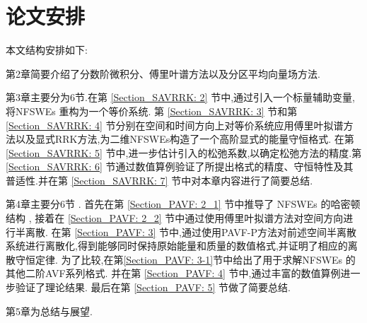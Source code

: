\section{论文安排}
本文结构安排如下:

第2章简要介绍了分数阶微积分、傅里叶谱方法以及分区平均向量场方法.

第3章主要分为6节.在第 \ref{Section_SAVRRK: 2} 节中,通过引入一个标量辅助变量,将NFSWEs  重构为一个等价系统.
第 \ref{Section_SAVRRK: 3} 节和第 \ref{Section_SAVRRK: 4} 节分别在空间和时间方向上对等价系统应用傅里叶拟谱方法以及显式RRK方法,为二维NFSWEs构造了一个高阶显式的能量守恒格式.
在第 \ref{Section_SAVRRK: 5} 节中,进一步估计引入的松弛系数,以确定松弛方法的精度.第 \ref{Section_SAVRRK: 6} 节通过数值算例验证了所提出格式的精度、守恒特性及其普适性.并在第 \ref{Section_SAVRRK: 7} 节中对本章内容进行了简要总结.

第4章主要分6节 . 首先在第 \ref{Section_PAVF: 2_1} 节中推导了 NFSWEs 的哈密顿结构 , 接着在 \ref{Section_PAVF: 2_2} 节中通过使用傅里叶拟谱方法对空间方向进行半离散.
在第 \ref{Section_PAVF: 3} 节中,通过使用PAVF-P方法对前述空间半离散系统进行离散化,得到能够同时保持原始能量和质量的数值格式,并证明了相应的离散守恒定律.
为了比较,在第\ref{Section_PAVF: 3-1}节中给出了用于求解NFSWEs  的其他二阶AVF系列格式.
并在第 \ref{Section_PAVF: 4} 节中,通过丰富的数值算例进一步验证了理论结果.
最后在第 \ref{Section_PAVF: 5} 节做了简要总结.

第5章为总结与展望.
